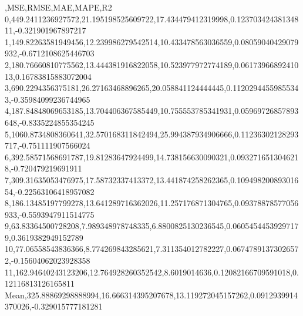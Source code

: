 ,MSE,RMSE,MAE,MAPE,R2
0,449.2411236927572,21.195198525609722,17.434479412319998,0.12370342438134811,-0.321901967897217
1,149.82263581949456,12.239986279542514,10.433478563036559,0.08059040429079932,-0.6712108625446703
2,180.76660810775562,13.444381916822058,10.523977972774189,0.0617396689241013,0.16783815883072004
3,690.2294356375181,26.27163468896265,20.058841124444445,0.11202944559855343,-0.35984099236744965
4,187.84848069653185,13.704406367585449,10.755553785341931,0.05969726857893648,-0.8335224855354245
5,1060.8734808360641,32.570168311842494,25.994387934906666,0.11236302128293717,-0.751111907566024
6,392.58571568691787,19.81283647924499,14.738156630090321,0.0932716513046218,-0.720479219691911
7,309.31635053476975,17.58732337413372,13.441874258262365,0.10949820089301654,-0.22563106418957082
8,186.13485197799278,13.641289716362026,11.257176871304765,0.09378878577056933,-0.5593947911514775
9,63.83364500728208,7.989348978748335,6.8800825130236545,0.06054544539297179,0.3619382949152789
10,77.06558543836366,8.774269843285621,7.311354012782227,0.06747891373026572,-0.15604062023928358
11,162.94640243123206,12.764928260352542,8.6019014636,0.12082166709591018,0.12116813126165811
Mean,325.88869298888994,16.666314395207678,13.119272045157262,0.0912939914370026,-0.329015777181281
